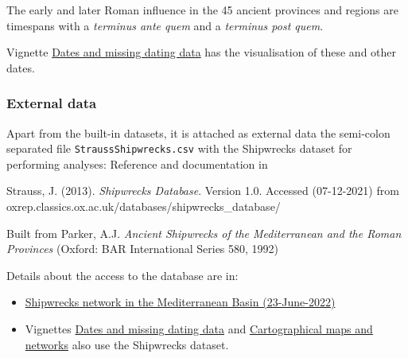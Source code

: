 \documentclass[a4paper,11pt]{memoir}
\begin{document}
The early and later Roman influence in the 45 ancient provinces and
regions are timespans with a \emph{terminus ante quem} and a
\emph{terminus post quem}.

Vignette \href{../doc/Dates.html}{Dates and missing dating data} has the
visualisation of these and other dates.

\hypertarget{external-data}{%
\subsubsection{External data}\label{external-data}}

Apart from the built-in datasets, it is attached as external data the
semi-colon separated file \texttt{StraussShipwrecks.csv} with the
Shipwrecks dataset for performing analyses: Reference and documentation
in

Strauss, J. (2013). \emph{Shipwrecks Database}. Version 1.0. Accessed
(07-12-2021) from
oxrep.classics.ox.ac.uk/databases/shipwrecks\_database/

Built from Parker, A.J. \emph{Ancient Shipwrecks of the Mediterranean
and the Roman Provinces} (Oxford: BAR International Series 580, 1992)

Details about the access to the database are in:

\begin{itemize}
\item
  \href{https://htmlpreview.github.io/?https://github.com/sdam-au/R_code/blob/master/HTML/Shipwrecks\%20Network\%20in\%20the\%20Mediterranean\%20Basin.html}{Shipwrecks
  network in the Mediterranean Basin (23-June-2022)}
\item
  Vignettes \href{../doc/Dates.html}{Dates and missing dating data} and
  \href{../doc/Maps.html}{Cartographical maps and networks} also use the
  Shipwrecks dataset.
\end{itemize}
\end{document}
